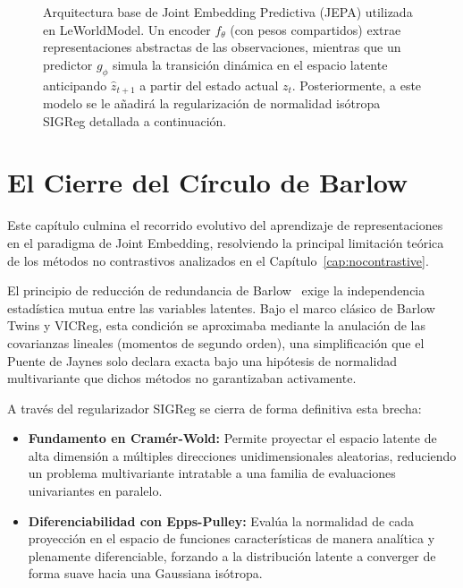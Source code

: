 \begin{figure}[H]
{
}
\caption{Arquitectura base de Joint Embedding Predictiva (JEPA) utilizada en LeWorldModel. Un encoder $f_\theta$ (con pesos compartidos) extrae representaciones abstractas de las observaciones, mientras que un predictor $g_\phi$ simula la transición dinámica en el espacio latente anticipando $\hat{z}_{t+1}$ a partir del estado actual $z_t$. Posteriormente, a este modelo se le añadirá la regularización de normalidad isótropa SIGReg detallada a continuación.}
\label{fig:lewm_jepa_arch}
\end{figure}


\section{El Cierre del Círculo de Barlow}
\label{sec:conclusiones_leworldmodel}

Este capítulo culmina el recorrido evolutivo del aprendizaje de representaciones en el paradigma de Joint Embedding, resolviendo la principal limitación teórica de los métodos no contrastivos analizados en el Capítulo~\ref{cap:nocontrastive}.

El principio de reducción de redundancia de Barlow~\cite{barlow1961possible} exige la independencia estadística mutua entre las variables latentes. Bajo el marco clásico de Barlow Twins y VICReg, esta condición se aproximaba mediante la anulación de las covarianzas lineales (momentos de segundo orden), una simplificación que el Puente de Jaynes solo declara exacta bajo una hipótesis de normalidad multivariante que dichos métodos no garantizaban activamente.

A través del regularizador SIGReg se cierra de forma definitiva esta brecha:
\begin{itemize}
    \item \textbf{Fundamento en Cramér-Wold:} Permite proyectar el espacio latente de alta dimensión a múltiples direcciones unidimensionales aleatorias, reduciendo un problema multivariante intratable a una familia de evaluaciones univariantes en paralelo.
    \item \textbf{Diferenciabilidad con Epps-Pulley:} Evalúa la normalidad de cada proyección en el espacio de funciones características de manera analítica y plenamente diferenciable, forzando a la distribución latente a converger de forma suave hacia una Gaussiana isótropa.
\end{itemize}

